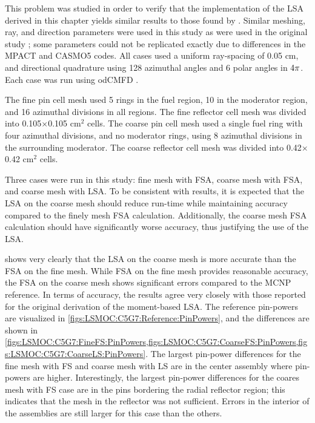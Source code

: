{{{      This problem was studied in order to verify that the implementation of the \ac{LSA} derived in this chapter yields similar results to those found by \citet{Ferrer2016}.
      Similar meshing, ray, and direction parameters were used in this study as were used in the original study \cite{Ferrer2016}; some parameters could not be replicated exactly due to differences in the MPACT and CASMO5 codes.
      All cases used a uniform ray-spacing of 0.05 cm, and directional quadrature using 128 azimuthal angles and 6 polar angles in $4\pi$.
      Each case was run using od\ac{CMFD} \cite{Zhu2016}.

      The fine pin cell mesh used 5 rings in the fuel region, 10 in the moderator region, and 16 azimuthal divisions in all regions.
      The fine reflector cell mesh was divided into 0.105$\times$0.105 cm$^2$ cells.
      The coarse pin cell mesh used a single fuel ring with four azimuthal divisions, and no moderator rings, using 8 azimuthal divisions in the surrounding moderator.
      The coarse reflector cell mesh was divided into 0.42$\times$0.42 cm$^2$ cells.

      Three cases were run in this study: fine mesh with \ac{FSA}, coarse mesh with \ac{FSA}, and coarse mesh with \ac{LSA}.
      To be consistent with \citet{Ferrer2016} results, it is expected that the \ac{LSA} on the coarse mesh should reduce run-time while maintaining accuracy compared to the finely mesh \ac{FSA} calculation.
      Additionally, the coarse mesh \ac{FSA} calculation should have significantly worse accuracy, thus justifying the use of the \ac{LSA}.

       shows very clearly that the \ac{LSA} on the coarse mesh is more accurate than the \ac{FSA} on the fine mesh.
      While \ac{FSA} on the fine mesh provides reasonable accuracy, the \ac{FSA} on the coarse mesh shows significant errors compared to the MCNP reference.
      In terms of accuracy, the results agree very closely with those reported for the original derivation of the moment-based \ac{LSA}.
      The reference pin-powers are visualized in \cref{figs:LSMOC:C5G7:Reference:PinPowers}, and the differences are shown in \cref{figs:LSMOC:C5G7:FineFS:PinPowers,figs:LSMOC:C5G7:CoarseFS:PinPowers,figs:LSMOC:C5G7:CoarseLS:PinPowers}.
      The largest pin-power differences for the fine mesh with \ac{FS} and coarse mesh with \ac{LS} are in the center assembly where pin-powers are higher.
      Interestingly, the largest pin-power differences for the coares mesh with \ac{FS} case are in the pins bordering the radial reflector region;
        this indicates that the mesh in the reflector was not sufficient.
      Errors in the interior of the assemblies are still larger for this case than the others.

}}}
